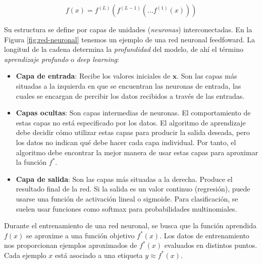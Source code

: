 \begin{equation}
f(x) = f^{(L)}(f^{(L-1)}(\dots f^{(1)}(x)))
\end{equation}

Su estructura se define por capas de unidades (\textit{neuronas}) interconectadas. En la Figura \ref{fig:red-neuronal} tenemos un ejemplo de una red neuronal feedfoward. La longitud de la cadena determina la \textit{profundidad} del modelo, de ahí el término \textit{aprendizaje profundo} o \textit{deep learning}:
\begin{itemize}
    \item \textbf{Capa de entrada}: Recibe los valores iniciales de $\mathbf{x}$. Son las capas más situadas a la izquierda en que se encuentran las neuronas de entrada, las cuales se encargan de percibir los datos recibidos a través de las entradas.
    \item \textbf{Capas ocultas}: Son capas intermedias de neuronas. El comportamiento de estas capas no está especificado por los datos. El algoritmo de aprendizaje debe decidir cómo utilizar estas capas para producir la salida deseada, pero los datos no indican qué debe hacer cada capa individual. Por tanto, el algoritmo debe encontrar la mejor manera de usar estas capas para aproximar la función $f^*$.
    \item \textbf{Capa de salida}: Son las capas más situadas a la derecha. Produce el resultado final de la red. Si la salida es un valor continuo (regresión), puede usarse una función de activación lineal o sigmoide. Para clasificación, se suelen usar funciones como softmax para probabilidades multinomiales.
\end{itemize}

Durante el entrenamiento de una red neuronal, se busca que la función aprendida $f(x)$ se aproxime a una función objetivo $f^*(x)$. Los datos de entrenamiento nos proporcionan ejemplos aproximados de $f^*(x)$ evaluados en distintos puntos. Cada ejemplo $x$ está asociado a una etiqueta $y \approx f^*(x)$.


